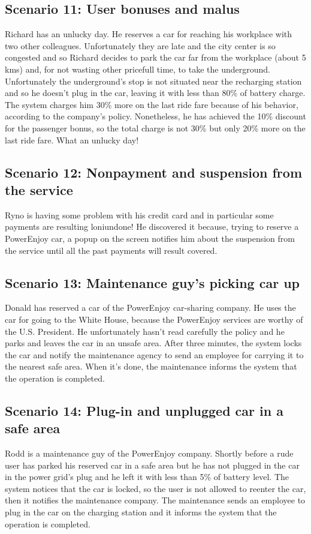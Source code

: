 \documentclass[10pt, a4paper,titlepage]{article}
\begin{document}
\subsection{Scenario 11: User bonuses and malus}
Richard has an unlucky day. He reserves a car for reaching his workplace with two other colleagues. Unfortunately they are late and the city center is so congested and so Richard decides to park the car far from the workplace (about 5 kms) and, for not wasting other pricefull time, to take the underground. Unfortunately the underground's stop is not situated near the recharging station and so he doesn't plug in the car, leaving it with less than 80\% of battery charge. The system charges him 30\% more on the last ride fare because of his behavior, according to the company's policy. Nonetheless, he has achieved the 10\% discount for the passenger bonus, so the total charge is not 30\% but only 20\% more on the last ride fare. What an unlucky day!
\subsection{Scenario 12: Nonpayment and suspension from the service}
Ryno is having some problem with his credit card and in particular some payments are resulting loniundone! He discovered it because, trying to reserve a PowerEnjoy car, a popup on the screen notifies him about the suspension from the service until all the past payments will result covered.
\subsection{Scenario 13: Maintenance guy's picking car up}
Donald has reserved a car of the PowerEnjoy car-sharing company. He uses the car for going to the White House, because the PowerEnjoy services are worthy of the U.S. President. He unfortunately hasn't read carefully the policy and he parks and leaves the car in an unsafe area. After three minutes, the system locks the car and notify the maintenance agency to send an employee for carrying it to the nearest safe area. When it's done, the maintenance informs the system that the operation is completed.
\subsection{Scenario 14: Plug-in and unplugged car in a safe area}
Rodd is a maintenance guy of the PowerEnjoy company. Shortly before a rude user has parked his reserved car in a safe area but he has not plugged in the car in the power grid's plug and he left it with less than 5\% of battery level. The system notices that the car is locked, so the user is not allowed to reenter the car, then it notifies the maintenance company. The maintenance sends an employee to plug in the car on the charging station and it informs the system that the operation is completed.
\newpage
\end{document}
